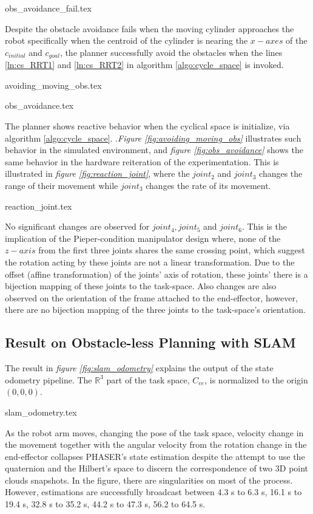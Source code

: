 {{obs_avoidance_fail.tex}

Despite the obstacle avoidance fails when the 
moving cylinder approaches the robot specifically 
when the centroid of the cylinder is nearing
the $x-axes$ of the $c_{initial}$ and $c_{goal}$,
the planner successfully avoid the obstacles when 
the lines
\ref{ln:cs_RRT1} and \ref{ln:cs_RRT2} in
algorithm \ref{algo:cycle_space} is invoked. 

{avoiding_moving_obs.tex}

{obs_avoidance.tex}

The planner shows reactive behavior when 
the cyclical space is initialize, via algorithm \ref{algo:cycle_space}.
.\textit{Figure \ref{fig:avoiding_moving_obs}} illustrates
such behavior in the simulated environment, and \textit{figure \ref{fig:obs_avoidance}}
shows the same behavior in the hardware reiteration of the experimentation. This is 
illustrated in \textit{ figure \ref{fig:reaction_joint}}, where the $joint_2$ and $joint_3$
changes the range of their movement while $joint_3$ changes the rate of its movement. 

{reaction_joint.tex}

No significant changes are observed for $joint_4, joint_5$ and $joint_6$. 
This is the implication of 
the Pieper-condition manipulator design where, none of the $z-axis$ from the first three
joints shares the same crossing point, which suggest the rotation acting by these joints 
are not a linear transformation. Due to the offset (affine transformation) of the joints' 
axis of rotation, these joints' there is a bijection mapping of these joints
to the task-space. Also changes are also observed on the orientation
of the frame attached to the end-effector, however, there are no bijection mapping of
the three joints to the task-space's orientation.

\subsection{Result on Obstacle-less Planning with SLAM}
The result in \textit{figure \ref{fig:slam_odometry}} explains the
output of the state odometry pipeline.  The $\mathbb{R}^3$ part of the 
task space, $C_{ee}$, is normalized to the origin $(0,0,0)$.

{slam_odometry.tex}

As the robot arm moves, changing the pose of the task space,
velocity change in the movement together with the
angular velocity from the rotation change in the end-effector
collapses \acrshort{PHASER}'s state estimation despite the attempt to use the quaternion and the 
Hilbert's space to discern the correspondence of two 3D point clouds 
snapshots. In the figure, there are singularities on most of the process. However,
estimations are successfully broadcast between
4.3 s to 6.3 s, 16.1 s to 19.4 s, 32.8 s to 35.2 s, 44.2 s to 47.3 s, 56.2 
to 64.5 s.


}
